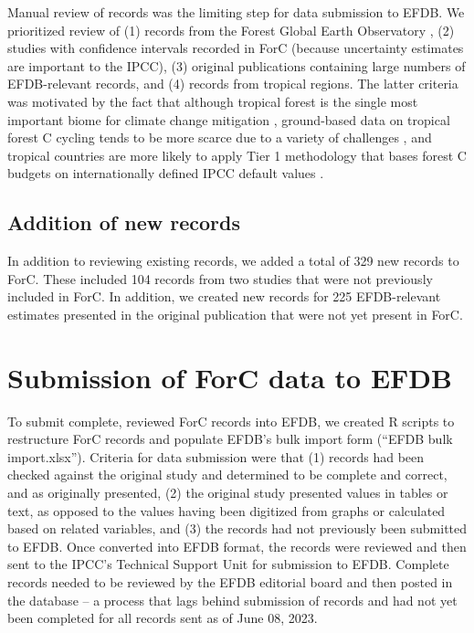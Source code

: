 \documentclass[, manuscript]{copernicus}
\begin{document}
Manual review of records was the limiting step for data submission to
EFDB. We prioritized review of (1) records from the Forest Global Earth
Observatory
\citep[ForestGEO,][]{anderson-teixeira_ctfsforestgeo_2015, davies_forestgeo_2021},
(2) studies with confidence intervals recorded in ForC (because
uncertainty estimates are important to the IPCC), (3) original
publications containing large numbers of EFDB-relevant records, and (4)
records from tropical regions. The latter criteria was motivated by the
fact that although tropical forest is the single most important biome
for climate change mitigation \citep{refs}, ground-based data on
tropical forest C cycling tends to be more scarce due to a variety of
challenges \citep{refs, delima_making_2022}, and tropical countries are
more likely to apply Tier 1 methodology that bases forest C budgets on
internationally defined IPCC default values
\citep{romijn_assessing_2015}.

\subsection{Addition of new records}

In addition to reviewing existing records, we added a total of 329 new
records to ForC. These included 104 records from two studies
\citep{piponiot_distribution_2022, lutz_largediameter_2021} that were
not previously included in ForC. In addition, we created new records for
225 EFDB-relevant estimates presented in the original publication that
were not yet present in ForC.

\section{Submission of ForC data to EFDB}

To submit complete, reviewed ForC records into EFDB, we created R
scripts to restructure ForC records and populate EFDB's bulk import form
(``EFDB bulk import.xlsx''). Criteria for data submission were that (1)
records had been checked against the original study and determined to be
complete and correct, and as originally presented, (2) the original
study presented values in tables or text, as opposed to the values
having been digitized from graphs or calculated based on related
variables, and (3) the records had not previously been submitted to
EFDB. Once converted into EFDB format, the records were reviewed and
then sent to the IPCC's Technical Support Unit for submission to EFDB.
Complete records needed to be reviewed by the EFDB editorial board and
then posted in the database -- a process that lags behind submission of
records and had not yet been completed for all records sent as of June
08, 2023.
\end{document}
